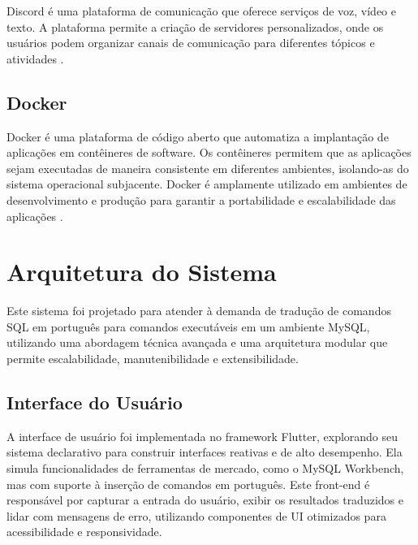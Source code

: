 Discord é uma plataforma de comunicação que oferece serviços de voz, vídeo e texto. A plataforma permite a criação de servidores personalizados, onde os usuários podem organizar canais de comunicação para diferentes tópicos e atividades \cite{discord2025}.

\subsection{Docker}

Docker é uma plataforma de código aberto que automatiza a implantação de aplicações em contêineres de software. Os contêineres permitem que as aplicações sejam executadas de maneira consistente em diferentes ambientes, isolando-as do sistema operacional subjacente. Docker é amplamente utilizado em ambientes de desenvolvimento e produção para garantir a portabilidade e escalabilidade das aplicações \cite{docker2025}.




\section{Arquitetura do Sistema}

Este sistema foi projetado para atender à demanda de tradução de comandos SQL em português para comandos executáveis em um ambiente MySQL, utilizando uma abordagem técnica avançada e uma arquitetura modular que permite escalabilidade, manutenibilidade e extensibilidade.

\subsection{Interface do Usuário}
A interface de usuário foi implementada no framework Flutter, explorando seu sistema declarativo para construir interfaces reativas e de alto desempenho. Ela simula funcionalidades de ferramentas de mercado, como o MySQL Workbench, mas com suporte à inserção de comandos em português. Este front-end é responsável por capturar a entrada do usuário, exibir os resultados traduzidos e lidar com mensagens de erro, utilizando componentes de UI otimizados para acessibilidade e responsividade.


